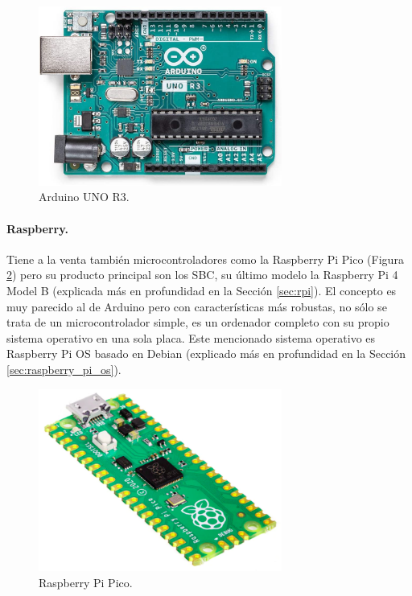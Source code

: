 \begin{figure} [h!]
  \begin{center}
    \includegraphics[width=8cm]{figs/arduino.jpg}
  \end{center}
  \caption{Arduino UNO R3.}
  \label{fig:arduino_uno}
\end{figure}

\paragraph{Raspberry.} Tiene a la venta también microcontroladores como la Raspberry Pi Pico (Figura \ref{fig:rpi_pico}) pero su producto principal son los SBC, su último modelo la Raspberry Pi 4 Model B (explicada más en profundidad en la Sección \ref{sec:rpi}). El concepto es muy parecido al de Arduino pero con características más robustas, no sólo se trata de un microcontrolador simple, es un ordenador completo con su propio sistema operativo en una sola placa. Este mencionado sistema operativo es Raspberry Pi OS basado en Debian (explicado más en profundidad en la Sección \ref{sec:raspberry_pi_os}). \\

\begin{figure} [h!]
  \begin{center}
    \includegraphics[width=8cm]{figs/raspberry-pi-pico.jpg}
  \end{center}
  \caption{Raspberry Pi Pico.}
  \label{fig:rpi_pico}
\end{figure}

